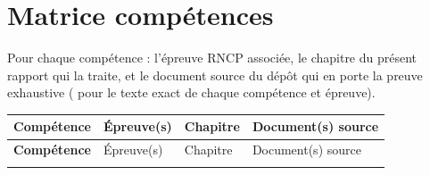 \chapter{Matrice compétences}
\label{annexe:matrice-competences}

Pour chaque compétence : l'épreuve RNCP associée, le chapitre du
présent rapport qui la traite, et le document source du dépôt qui en
porte la preuve exhaustive
(
pour le texte exact de chaque compétence et épreuve).

\begin{longtable}{@{}>{\bfseries}p{2.3cm} p{1.8cm} p{1.5cm} p{10.2cm}@{}}
\toprule
Compétence & Épreuve(s) & Chapitre & Document(s) source \\
\midrule
\endfirsthead
\toprule
Compétence & Épreuve(s) & Chapitre & Document(s) source \\
\midrule
\endhead
\bottomrule
\endfoot


\end{longtable}
